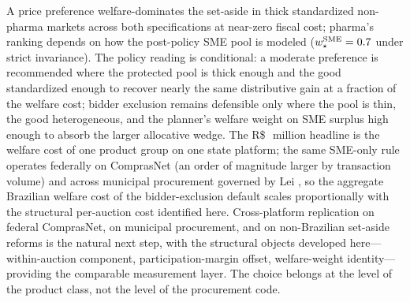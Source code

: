 A \optPrefThreshold{} price preference welfare-dominates the set-aside in thick standardized non-pharma markets across both specifications at near-zero fiscal cost; pharma's ranking depends on how the post-policy SME pool is modeled ($w^{\text{SME}}_\star = 0.7$ under strict invariance). The policy reading is conditional: a moderate preference is recommended where the protected pool is thick enough and the good standardized enough to recover nearly the same distributive gain at a fraction of the welfare cost; bidder exclusion remains defensible only where the pool is thin, the good heterogeneous, and the planner's welfare weight on SME surplus high enough to absorb the larger allocative wedge. The R\$\,\welfAnnualBRLLo~million headline is the welfare cost of one product group on one state platform; the same SME-only rule operates federally on ComprasNet (an order of magnitude larger by transaction volume) and across municipal procurement governed by Lei \leiNova, so the aggregate Brazilian welfare cost of the bidder-exclusion default scales proportionally with the structural per-auction cost identified here. Cross-platform replication on federal ComprasNet, on municipal procurement, and on non-Brazilian set-aside reforms is the natural next step, with the structural objects developed here---within-auction component, participation-margin offset, welfare-weight identity---providing the comparable measurement layer. The choice belongs at the level of the product class, not the level of the procurement code.
